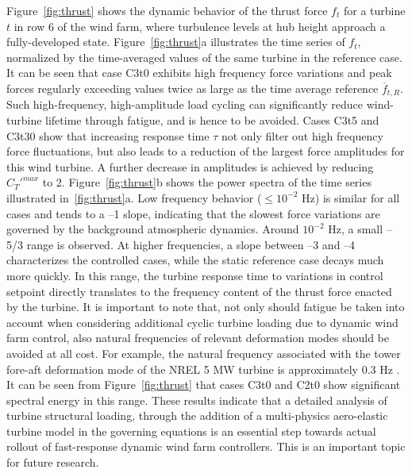Figure~\ref{fig:thrust} shows the dynamic behavior of the thrust force $f_t$ for a turbine $t$ in row 6 of the wind farm, where turbulence levels at hub height approach a fully-developed state. Figure~\ref{fig:thrust}a illustrates the time series of $f_t$, normalized by the time-averaged values of the same turbine in the reference case. It can be seen that case C3t0 exhibits high frequency force variations and peak forces regularly exceeding values twice as large as the time average reference $\overline{f}_{t,R}$. Such high-frequency, high-amplitude load cycling can significantly reduce wind-turbine lifetime through fatigue, and is hence to be avoided. Cases C3t5 and C3t30 show that increasing response time $\tau$ not only filter out high frequency force fluctuations, but also leads to a reduction of the largest force amplitudes for this wind turbine. A further decrease in amplitudes is achieved by reducing $C_T'^{max}$ to 2. Figure~\ref{fig:thrust}b shows the power spectra of the time series illustrated in~\ref{fig:thrust}a. Low frequency behavior ($\leq 10^{-2}$ Hz) is similar for all cases and tends to a --1 slope, indicating that the slowest force variations are governed by the background atmospheric dynamics. Around $10^{-2}$ Hz, a small --5/3 range is observed. At higher frequencies, a slope between --3 and --4 characterizes the controlled cases,  while the static reference case decays much more quickly. In this range, the turbine response time to variations in control setpoint directly translates to the frequency content of the thrust force enacted by the turbine. It is important to note that, not only should fatigue be taken into account when considering additional cyclic turbine loading due to dynamic wind farm control, also natural frequencies of relevant deformation modes should be avoided at all cost. For example, the natural frequency associated with the tower fore-aft deformation mode of the NREL 5 MW turbine is approximately 0.3 Hz \citep{jonkman2009definition}. It can be seen from Figure~\ref{fig:thrust} that cases C3t0 and C2t0 show significant spectral energy in this range. These results indicate that a detailed analysis of turbine structural loading, through the addition of a multi-physics aero-elastic turbine model in the governing equations is an essential step towards actual rollout of fast-response dynamic wind farm controllers. This is an important topic for future research.

